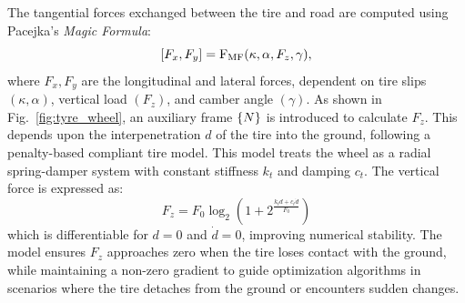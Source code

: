 The tangential forces exchanged between the tire and road are computed using \mbox{Pacejka's} \emph{Magic Formula}:
\begin{equation}\label{eqn_mf}
	[F_x,F_y]=\mf(\kappa,\alpha,F_z,\gamma),
\end{equation}
where $ F_x, F_y $ are the longitudinal and lateral forces, dependent on tire slips $( \kappa, \alpha )$, vertical load $( F_z )$, and camber angle $( \gamma )$.
As shown in Fig.~\ref{fig:tyre_wheel}, an auxiliary frame $\left\{N\right\}$ is introduced to calculate $ F_z $. This depends upon the interpenetration $ d $ of the tire into the ground, following a penalty-based compliant tire model. This model treats the wheel as a radial spring-damper system with constant stiffness $ k_t $ and damping $ c_t $. The vertical force is expressed as:
\begin{equation}\label{eqn_Fz}
	F_z= F_0\log_2\left(1 + 2^{\frac{k_t d + c_t \dot{d}}{F_0}}\right)
\end{equation}
which is differentiable for $ d = 0 $ and $\dot{d} = 0$, improving numerical stability. The model ensures $ F_z $ approaches zero when the tire loses contact with the ground, while maintaining a non-zero gradient to guide optimization algorithms in scenarios where the tire detaches from the ground or encounters sudden changes.

